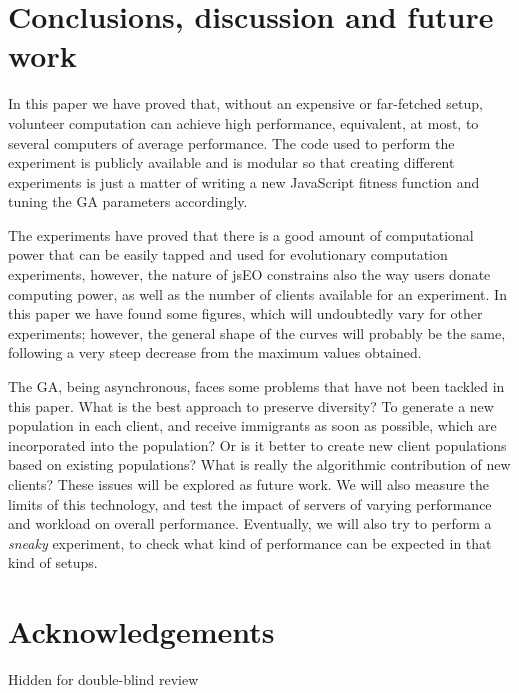 \documentclass[runningheads,a4paper]{llncs}
\begin{document}
\section{Conclusions, discussion and future work}
\label{sec:conc}

In this paper we have proved that, 
without an expensive or far-fetched setup, volunteer computation can achieve high
performance, equivalent, at most, to several computers of average
performance. The code used to perform the experiment is publicly
available and is modular so that creating different experiments is
just a matter of writing a new JavaScript fitness function and tuning
the GA parameters accordingly. 

The experiments have proved that there is a good amount of
computational power that can be easily tapped and used for
evolutionary computation experiments, however, the nature of jsEO
constrains also the way users donate computing power, as well as the
number of clients available for an experiment. In this paper we have
found some figures, which will undoubtedly vary for other experiments;
however, the general shape of the curves will probably be the same,
following a very steep decrease from the maximum values obtained. 

The GA, being asynchronous, faces some problems that have not been
tackled in this paper. What is the best approach to preserve
diversity? To generate a new population in each client, and receive
immigrants as soon as possible, which are incorporated into the
population? Or is it better to create new client populations based on
existing populations? What is really the algorithmic contribution of
new clients? These issues will be explored as future work. 
We will also measure the limits of this technology, and test
the impact of servers of varying performance and workload on overall
performance. Eventually, we will also try to perform a {\em sneaky}
experiment, to check what kind of performance can be expected in that
kind of setups. 

\section*{Acknowledgements}

Hidden for double-blind review





\end{document}
